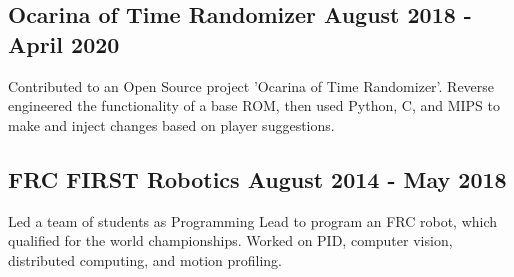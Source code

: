 \documentclass[letterpaper,11pt]{article}
\begin{document}
    \subsection{Ocarina of Time Randomizer \null\hfill August 2018 - April 2020}
    \vspace*{-2mm}
    Contributed to an Open Source project 'Ocarina of Time Randomizer'. Reverse engineered the functionality of a base ROM, then used Python, C, and MIPS to make and inject changes based on player suggestions.
    \vspace*{-2mm}
    \subsection{FRC FIRST Robotics \null\hfill August 2014 - May 2018}
    \vspace*{-2mm}
    Led a team of students as Programming Lead to program an FRC robot, which qualified for the world championships. Worked on PID, computer vision, distributed computing, and motion profiling.
    \vspace*{-2mm}
\end{document}
